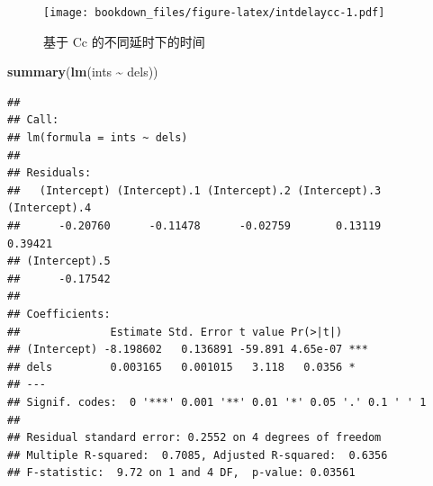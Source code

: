 \documentclass[
]{krantz}
\makeatletter
\newenvironment{Shaded}{\begin{snugshade}}{\end{snugshade}}
\newcommand{\CommentTok}[1]{\textcolor[rgb]{0.56,0.35,0.01}{\textit{#1}}}
\newcommand{\DecValTok}[1]{\textcolor[rgb]{0.00,0.00,0.81}{#1}}
\newcommand{\KeywordTok}[1]{\textcolor[rgb]{0.13,0.29,0.53}{\textbf{#1}}}
\newcommand{\NormalTok}[1]{#1}
\newcommand{\OperatorTok}[1]{\textcolor[rgb]{0.81,0.36,0.00}{\textbf{#1}}}
\newcommand{\StringTok}[1]{\textcolor[rgb]{0.31,0.60,0.02}{#1}}
\newenvironment{kframe}{%
\medskip{}
\setlength{\fboxsep}{.8em}
 \def\at@end@of@kframe{}%
 \ifinner\ifhmode%
  \def\at@end@of@kframe{\end{minipage}}%
  \begin{minipage}{\columnwidth}%
 \fi\fi%
 \def\FrameCommand##1{\hskip\@totalleftmargin \hskip-\fboxsep
 \colorbox{shadecolor}{##1}\hskip-\fboxsep
     \hskip-\linewidth \hskip-\@totalleftmargin \hskip\columnwidth}%
 \MakeFramed {\advance\hsize-\width
   \@totalleftmargin\z@ \linewidth\hsize
   \@setminipage}}%
 {\par\unskip\endMakeFramed%
 \at@end@of@kframe}
\renewenvironment{Shaded}{\begin{kframe}}{\end{kframe}}
\makeatother
\begin{document}
\begin{figure}
\centering
\texttt{[image: bookdown\_files/figure-latex/intdelaycc-1.pdf]}
\caption{\label{fig:intdelaycc}基于 Cc 的不同延时下的时间}
\end{figure}

\begin{Shaded}
\begin{Highlighting}[]
\KeywordTok{summary}\NormalTok{(}\KeywordTok{lm}\NormalTok{(ints }\OperatorTok{\textasciitilde{}}\StringTok{ }\NormalTok{dels))}
\end{Highlighting}
\end{Shaded}

\begin{verbatim}
## 
## Call:
## lm(formula = ints ~ dels)
## 
## Residuals:
##   (Intercept) (Intercept).1 (Intercept).2 (Intercept).3 (Intercept).4 
##      -0.20760      -0.11478      -0.02759       0.13119       0.39421 
## (Intercept).5 
##      -0.17542 
## 
## Coefficients:
##              Estimate Std. Error t value Pr(>|t|)    
## (Intercept) -8.198602   0.136891 -59.891 4.65e-07 ***
## dels         0.003165   0.001015   3.118   0.0356 *  
## ---
## Signif. codes:  0 '***' 0.001 '**' 0.01 '*' 0.05 '.' 0.1 ' ' 1
## 
## Residual standard error: 0.2552 on 4 degrees of freedom
## Multiple R-squared:  0.7085,	Adjusted R-squared:  0.6356 
## F-statistic:  9.72 on 1 and 4 DF,  p-value: 0.03561
\end{verbatim}

\begin{Shaded}
\end{Shaded}
\end{document}
